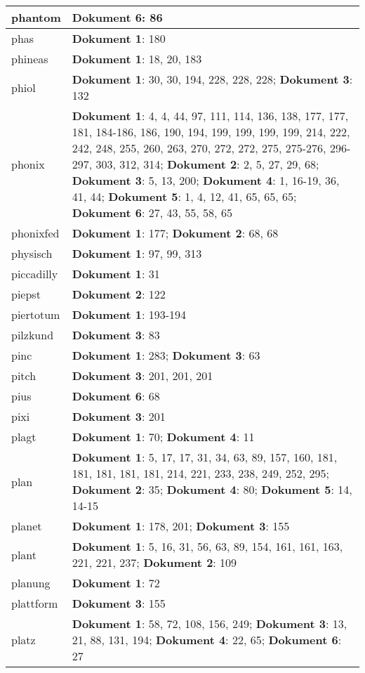 \documentclass[a5paper]{article}
\begin{document}
\begin{longtable}[l]{|l|p{3in}|}
\hline
phantom & \textbf{Dokument 6}: 86 \\
\hline
phas & \textbf{Dokument 1}: 180 \\
\hline
phineas & \textbf{Dokument 1}: 18, 20, 183 \\
\hline
phiol & \textbf{Dokument 1}: 30, 30, 194, 228, 228, 228; \textbf{Dokument 3}: 132 \\
\hline
phonix & \textbf{Dokument 1}: 4, 4, 44, 97, 111, 114, 136, 138, 177, 177, 181, 184-186, 186, 190, 194, 199, 199, 199, 199, 214, 222, 242, 248, 255, 260, 263, 270, 272, 272, 275, 275-276, 296-297, 303, 312, 314; \textbf{Dokument 2}: 2, 5, 27, 29, 68; \textbf{Dokument 3}: 5, 13, 200; \textbf{Dokument 4}: 1, 16-19, 36, 41, 44; \textbf{Dokument 5}: 1, 4, 12, 41, 65, 65, 65; \textbf{Dokument 6}: 27, 43, 55, 58, 65 \\
\hline
phonixfed & \textbf{Dokument 1}: 177; \textbf{Dokument 2}: 68, 68 \\
\hline
physisch & \textbf{Dokument 1}: 97, 99, 313 \\
\hline
piccadilly & \textbf{Dokument 1}: 31 \\
\hline
piepst & \textbf{Dokument 2}: 122 \\
\hline
piertotum & \textbf{Dokument 1}: 193-194 \\
\hline
pilzkund & \textbf{Dokument 3}: 83 \\
\hline
pinc & \textbf{Dokument 1}: 283; \textbf{Dokument 3}: 63 \\
\hline
pitch & \textbf{Dokument 3}: 201, 201, 201 \\
\hline
pius & \textbf{Dokument 6}: 68 \\
\hline
pixi & \textbf{Dokument 3}: 201 \\
\hline
plagt & \textbf{Dokument 1}: 70; \textbf{Dokument 4}: 11 \\
\hline
plan & \textbf{Dokument 1}: 5, 17, 17, 31, 34, 63, 89, 157, 160, 181, 181, 181, 181, 181, 214, 221, 233, 238, 249, 252, 295; \textbf{Dokument 2}: 35; \textbf{Dokument 4}: 80; \textbf{Dokument 5}: 14, 14-15 \\
\hline
planet & \textbf{Dokument 1}: 178, 201; \textbf{Dokument 3}: 155 \\
\hline
plant & \textbf{Dokument 1}: 5, 16, 31, 56, 63, 89, 154, 161, 161, 163, 221, 221, 237; \textbf{Dokument 2}: 109 \\
\hline
planung & \textbf{Dokument 1}: 72 \\
\hline
plattform & \textbf{Dokument 3}: 155 \\
\hline
platz & \textbf{Dokument 1}: 58, 72, 108, 156, 249; \textbf{Dokument 3}: 13, 21, 88, 131, 194; \textbf{Dokument 4}: 22, 65; \textbf{Dokument 6}: 27 \\

\end{longtable}
\end{document}
